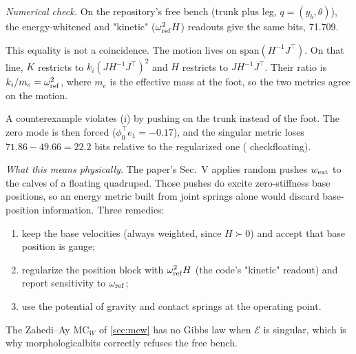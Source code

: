 \documentclass[11pt]{article}
\theoremstyle{definition}
\theoremstyle{remark}
\newcommand{\Em}{\mathcal{E}}         %
\newcommand{\codeus}{\textunderscore\allowbreak}
\newcommand{\code}[1]{{\ttfamily\let\_\codeus\hyphenchar\font=-1 #1}}
\newcommand{\checked}[1]{\par\smallskip\noindent\textit{Numerical check.} #1\par}
\newcommand{\phys}[1]{\par\smallskip\noindent\textit{What this means physically.} #1\par}
\begin{document}
\checked{On the repository's free bench (trunk plus leg, $q=(y_b,\theta)$), the
energy-whitened and \code{"kinetic"} ($\omega_{\rm ref}^2H$) readouts give the same bits,
71.709.

This equality is not a coincidence. The motion lives on $\mathrm{span}(H^{-1}J^\top)$. On
that line, $K$ restricts to $k_i(JH^{-1}J^\top)^2$ and $H$ restricts to $JH^{-1}J^\top$.
Their ratio is $k_i/m_e=\omega_{\rm ref}^2$, where $m_e$ is the effective mass at the foot,
so the two metrics agree on the motion.

A counterexample violates (i) by pushing on the trunk instead of the foot. The zero mode
is then forced ($\phi_0^\top e_1=-0.17$), and the singular metric loses
$71.86-49.66=22.2$ bits relative to the regularized one (\code{check\_floating}).}

\phys{The paper's Sec.~V applies random pushes $w_{\rm ext}$ to the calves of a floating
quadruped. Those pushes do excite zero-stiffness base positions, so an energy metric built
from joint springs alone would discard base-position information. Three remedies:
\begin{enumerate}[nosep]
  \item keep the base velocities (always weighted, since $H\succ0$) and accept that base
        position is gauge;
  \item regularize the position block with $\omega_{\rm ref}^2H$ (the code's
        \code{"kinetic"} readout) and report sensitivity to $\omega_{\rm ref}$;
  \item use the potential of gravity and contact springs at the operating point.
\end{enumerate}
The Zahedi--Ay $\mathrm{MC}_W$ of \cref{sec:mcw} has no Gibbs law when $\Em$ is singular,
which is why \code{morphological\_bits} correctly refuses the free bench.}
\end{document}
